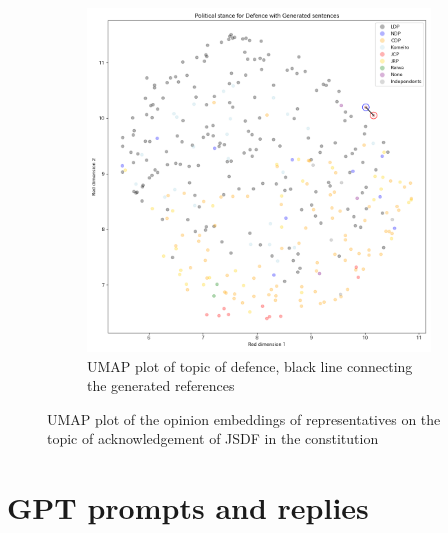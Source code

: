 \documentclass[final,5p,times,twocolumn,authoryear]{elsarticle}
\begin{document}
\begin{figure}[h]
    \begin{subfigure}{0.3\textwidth}
      \centering
      \includegraphics[width=1\linewidth]{figs/defence_umap_gen.png}
      \caption{UMAP plot of topic of defence, black line connecting the generated references}
      \label{fig:sub2}
    \end{subfigure}
\caption{UMAP plot of the opinion embeddings of representatives on the topic of acknowledgement of JSDF in the constitution \citep{kato2024lupinllmbasedpoliticalideology}}
\label{fig: Previous umap}
\end{figure}

\FloatBarrier
\section{GPT prompts and replies}
\label{app:gpt-prompts}
\end{document}
